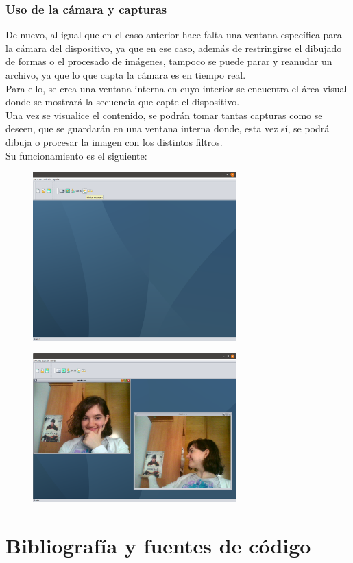 \documentclass[11pt,a4paper]{article}
\begin{document}

\subsubsection{Uso de la cámara y capturas}
De nuevo, al igual que en el caso anterior hace falta una ventana específica para la cámara del dispositivo, ya que en ese caso, además de restringirse el dibujado de formas o el procesado de imágenes, tampoco se puede parar y reanudar un archivo, ya que lo que capta la cámara es en tiempo real.\\

Para ello, se crea una ventana interna en cuyo interior se encuentra el área visual donde se mostrará la secuencia que capte el dispositivo.\\

Una vez se visualice el contenido, se podrán tomar tantas capturas como se deseen, que se guardarán en una ventana interna donde, esta vez sí, se podrá dibuja o procesar la imagen con los distintos filtros.\\

Su funcionamiento es el siguiente:\\

\begin{figure}[H]
\centering
	\includegraphics[width=0.7\textwidth]{img/webcam.png}
\end{figure}

\begin{figure}[H]
\centering
	\includegraphics[width=0.7\textwidth]{img/captura.png}
\end{figure}

\newpage

\section{Bibliografía y fuentes de código}
\end{document}
